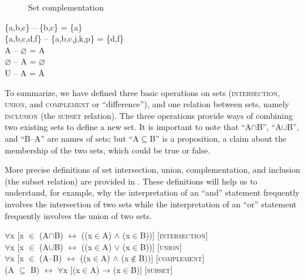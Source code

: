 \begin{figure}
  
\caption{\label{fig:key:4} Set complementation}
\end{figure}

\begin{stylepoints}
\{a,b,c\} – \{b,c\} = \{a\}\\
\{a,b,c,d,f\} – \{a,b,c,j,k,p\} = \{d,f\}\\
A – ⌀ = A\\
⌀ – A = ⌀\\
U – A = \=A
\end{stylepoints}


To summarize, we have defined three basic operations on sets (\textsc{intersection}, \textsc{union}, and \textsc{complement} or “difference”), and one relation between sets, namely \textsc{inclusion} (the \textsc{subset} relation). The three operations provide ways of combining two existing sets to define a new set. It is important to note that “A${\cap}$B”, “A${\cup}$B”, and “B–A” are names of sets; but “A${\subseteq}$B” is a proposition, a claim about the membership of the two sets, which could be true or false.



More precise definitions of set intersection, union, complementation, and inclusion (the subset relation) are provided in . These definitions will help us to understand, for example, why the interpretation of an “and” statement frequently involves the intersection of two sets while the interpretation of an “or” statement frequently involves the union of two sets.


\ea
${\forall}$x [x ${\in}$ (A${\cap}$B)  $\leftrightarrow $  ((x${\in}$A) $\wedge$ (x${\in}$B))]  [\textsc{intersection}]\\
${\forall}$x [x ${\in}$ (A${\cup}$B)  $\leftrightarrow $  ((x${\in}$A) $\vee$ (x${\in}$B))]  [\textsc{union}]\\
${\forall}$x [x ${\in}$ (A–B)  $\leftrightarrow $  ((x${\in}$A) $\wedge$ (x${\notin}$B))]  [\textsc{complement}]\\
(A ${\subseteq}$ B)  $\leftrightarrow $  ${\forall}$x [(x${\in}$A) → (x${\in}$B)]  [\textsc{subset}]
\z

